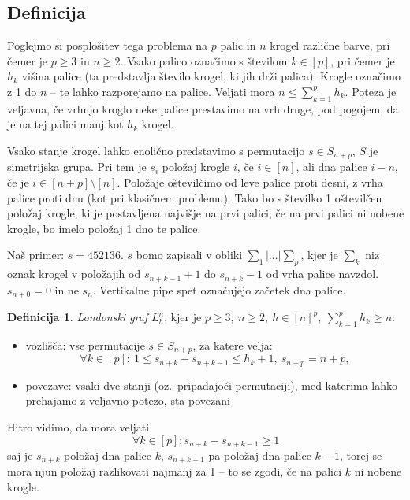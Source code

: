 \documentclass[11pt,a4paper]{article}
\theoremstyle{definition} %
\newtheorem{definicija}{Definicija}[section]
\theoremstyle{plain} %
\begin{document}
\subsection{Definicija}

Poglejmo si posplošitev tega problema na $p$ palic in $n$ krogel različne barve, pri čemer je $p \geq 3 \text{ in } n \geq 2$. Vsako palico označimo s številom $k \in [p]$, pri čemer je $h_k$ višina palice (ta predstavlja število krogel, ki jih drži palica). Krogle označimo z 1 do $n$ -- te lahko razporejamo na palice. Veljati mora $n \leq \sum_{k=1}^p h_k$. Poteza je veljavna, če vrhnjo kroglo neke palice prestavimo na vrh druge, pod pogojem, da je na tej palici manj kot $h_k$ krogel.

Vsako stanje krogel lahko enolično predstavimo s permutacijo $s \in S_{n+p}$, $S$ je simetrijska grupa. Pri tem je $s_i$ položaj krogle $i$, če $i \in [n] $, ali dna palice $i-n$, če je $i \in [n+p] \setminus [n] $. Položaje oštevilčimo od leve palice proti desni, z vrha palice proti dnu (kot pri klasičnem problemu). Tako bo s številko 1 oštevilčen položaj krogle, ki je postavljena najvišje na prvi palici; če na prvi palici ni nobene krogle, bo imelo položaj 1 dno te palice.

Naš primer: $s = 452136$.
{\small $s$ bomo zapisali v obliki $ \sum_1 | \ldots | \sum_p $, kjer je $\sum_k$ niz oznak krogel v položajih od $s_{n+k-1} + 1$ do $s_{n+k}-1$ od vrha palice navzdol. $s_{n+0} = 0$ in ne $s_n$. Vertikalne pipe spet označujejo začetek dna palice.}

\begin{definicija}
    \emph{Londonski graf} $L_h^n$, kjer je $p \geq 3,\ n \geq 2,\ h \in [n]^p,\  \sum_{k=1}^p h_k \geq n$:
    \begin{itemize}
        \item vozlišča: vse permutacije $s \in S_{n+p}$, za katere velja:
        \[\forall k \in [p]:\ 1 \leq s_{n+k} - s_{n+k-1} \leq h_k + 1,\ s_{n+p} = n + p ,\]
        \item povezave: vsaki dve stanji (oz.\ pripadajoči permutaciji), med katerima lahko prehajamo z veljavno potezo, sta povezani
    \end{itemize}
\end{definicija}

Hitro vidimo, da mora veljati 
\[\forall k \in [p]\colon s_{n+k} - s_{n+k-1} \geq 1 \]
saj je $s_{n+k}$ položaj dna palice $k$, $s_{n+k-1}$ pa položaj dna palice $k-1$, torej se mora njun položaj razlikovati najmanj za 1 -- to se zgodi, če na palici $k$ ni nobene krogle.
\end{document}
